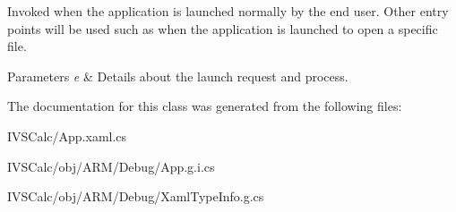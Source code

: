 Invoked when the application is launched normally by the end user. Other entry points will be used such as when the application is launched to open a specific file. 


\begin{DoxyParams}{Parameters}
{\em e} & Details about the launch request and process.\\
\hline
\end{DoxyParams}


The documentation for this class was generated from the following files\+:\begin{DoxyCompactItemize}
\item 
I\+V\+S\+Calc/App.\+xaml.\+cs\item 
I\+V\+S\+Calc/obj/\+A\+R\+M/\+Debug/App.\+g.\+i.\+cs\item 
I\+V\+S\+Calc/obj/\+A\+R\+M/\+Debug/Xaml\+Type\+Info.\+g.\+cs\end{DoxyCompactItemize}
